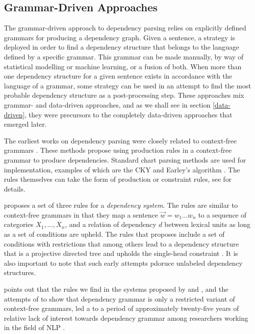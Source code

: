 \subsection{Grammar-Driven Approaches}
\label{grammar-driven}

The grammar-driven approach to dependency parsing relies on explicitly defined grammars for producing a dependency graph. Given a sentence, a strategy is deployed in order to find a dependency structure that belongs to the language defined by a specific grammar. This grammar can be made manually, by way of statistical modelling or machine learning, or a fusion of both. When more than one dependency structure for a given sentence exists in accordance with the language of a grammar, some strategy can be used in an attempt to find the most probable dependency structure as a post-processing step. These approaches mix grammar- and data-driven approaches, and as we shall see in section \ref{data-driven}, they were precursors to the completely data-driven approaches that emerged later.

The earliest works on dependency parsing were closely related to context-free grammars \cite{KublerEtAl:09}. These methods propose using production rules in a context-free grammar to produce dependencies. Standard chart parsing methods are used for implementation, examples of which are the CKY \cite{Younger:67} and Earley's algorithm \cite{Early:70}. The rules themselves can take the form of production or constraint rules, see  for details.

\citeauthor{Gaifman:65} proposes a set of three rules for a \textit{dependency system}. The rules are similar to context-free grammars in that they map a sentence $\vec{w} = w_1 ... w_n$ to a sequence of categories $X_1, ..., X_n$, and a relation of dependency $d$ between lexical units as long as a set of conditions are upheld. The rules that \citeauthor{Gaifman:65} proposes include a set of conditions with restrictions that among others lead to a dependency structure that is a projective directed tree and upholds the single-head constraint \cite{Gaifman:65}. It is also important to note that such early attempts pdoruce unlabeled dependency structures. 

\citeauthor{Niv:05} points out that the rules we find in the systems proposed by  and , and the attempts of \citeauthor{Gaifman:65} to show that dependency grammar is only a restricted variant of context-free grammars, led a to a period of approximately twenty-five years of relative lack of interest towards dependency grammar among researchers working in the field of NLP \cite{Niv:05}. 


